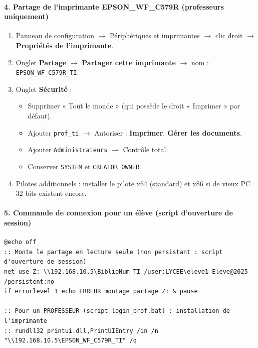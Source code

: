 \documentclass[11pt]{article}
\begin{document}
\begin{exoresolu}
\paragraph{4. Partage de l'imprimante EPSON\_WF\_C579R (professeurs uniquement)}
\begin{enumerate}
    \item Panneau de configuration $\rightarrow$ Périphériques et imprimantes $\rightarrow$ clic droit $\rightarrow$ \textbf{Propriétés de l'imprimante}.
    \item Onglet \textbf{Partage} $\rightarrow$ \textbf{Partager cette imprimante} $\rightarrow$ nom : \texttt{EPSON\_WF\_C579R\_TI}.
    \item Onglet \textbf{Sécurité} :
    \begin{itemize}
        \item Supprimer « Tout le monde » (qui possède le droit « Imprimer » par défaut).
        \item Ajouter \texttt{prof\_ti} $\rightarrow$ Autoriser : \textbf{Imprimer}, \textbf{Gérer les documents}.
        \item Ajouter \texttt{Administrateurs} $\rightarrow$ Contrôle total.
        \item Conserver \texttt{SYSTEM} et \texttt{CREATOR OWNER}.
    \end{itemize}
    \item Pilotes additionnels : installer le pilote x64 (standard) et x86 si de vieux PC 32 bits existent encore.
\end{enumerate}

\paragraph{5. Commande de connexion pour un élève (script d'ouverture de session)}
\begin{lstlisting}
@echo off
:: Monte le partage en lecture seule (non persistant : script d'ouverture de session)
net use Z: \\192.168.10.5\BiblioNum_TI /user:LYCEE\eleve1 Eleve@2025 /persistent:no
if errorlevel 1 echo ERREUR montage partage Z: & pause

:: Pour un PROFESSEUR (script login_prof.bat) : installation de l'imprimante
:: rundll32 printui.dll,PrintUIEntry /in /n "\\192.168.10.5\EPSON_WF_C579R_TI" /q
\end{lstlisting}


\end{exoresolu}
\end{document}
